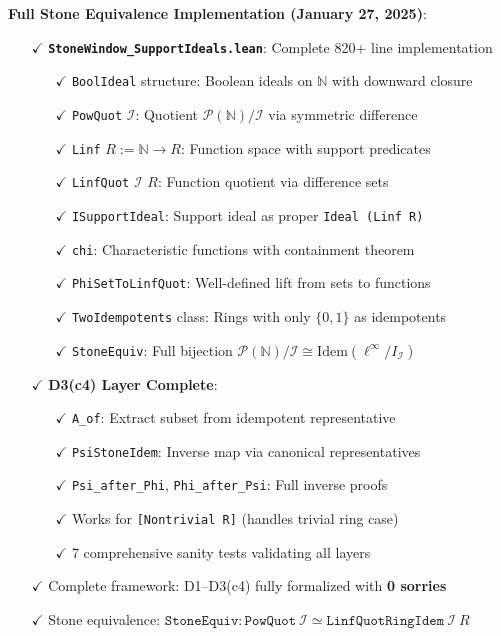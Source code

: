 \documentclass[11pt]{article}
\theoremstyle{definition}
\theoremstyle{remark}
\begin{document}
\textbf{Full Stone Equivalence Implementation (January 27, 2025)}:
\begin{itemize}
\item[$\checkmark$] \textbf{\texttt{StoneWindow\_SupportIdeals.lean}}: Complete 820+ line implementation
  \begin{itemize}
  \item[$\checkmark$] \texttt{BoolIdeal} structure: Boolean ideals on $\mathbb{N}$ with downward closure
  \item[$\checkmark$] \texttt{PowQuot} $\mathcal{I}$: Quotient $\mathcal{P}(\mathbb{N})/\mathcal{I}$ via symmetric difference
  \item[$\checkmark$] \texttt{Linf} $R := \mathbb{N} \to R$: Function space with support predicates
  \item[$\checkmark$] \texttt{LinfQuot} $\mathcal{I}$ $R$: Function quotient via difference sets
  \item[$\checkmark$] \texttt{ISupportIdeal}: Support ideal as proper \texttt{Ideal (Linf R)}
  \item[$\checkmark$] \texttt{chi}: Characteristic functions with containment theorem
  \item[$\checkmark$] \texttt{PhiSetToLinfQuot}: Well-defined lift from sets to functions
  \item[$\checkmark$] \texttt{TwoIdempotents} class: Rings with only $\{0,1\}$ as idempotents
  \item[$\checkmark$] \texttt{StoneEquiv}: Full bijection $\mathcal{P}(\mathbb{N})/\mathcal{I} \cong \text{Idem}(\ell^\infty/I_{\mathcal{I}})$
  \end{itemize}
\item[$\checkmark$] \textbf{D3(c4) Layer Complete}:
  \begin{itemize}
  \item[$\checkmark$] \texttt{A\_of}: Extract subset from idempotent representative
  \item[$\checkmark$] \texttt{PsiStoneIdem}: Inverse map via canonical representatives
  \item[$\checkmark$] \texttt{Psi\_after\_Phi}, \texttt{Phi\_after\_Psi}: Full inverse proofs
  \item[$\checkmark$] Works for \texttt{[Nontrivial R]} (handles trivial ring case)
  \item[$\checkmark$] 7 comprehensive sanity tests validating all layers
  \end{itemize}
\item[$\checkmark$] Complete framework: D1--D3(c4) fully formalized with \textbf{0 sorries}
\item[$\checkmark$] Stone equivalence: $\texttt{StoneEquiv} : \texttt{PowQuot}\ \mathcal{I} \simeq \texttt{LinfQuotRingIdem}\ \mathcal{I}\ R$
\end{itemize}
\end{document}
